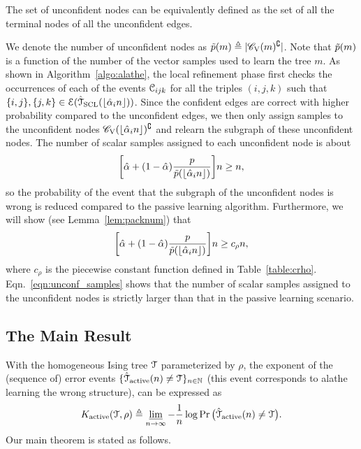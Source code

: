 \begin{remark}
    The set of unconfident nodes can be equivalently defined as the set of all the terminal nodes of all the unconfident edges.
\end{remark}
We denote the number of unconfident nodes as $\tilde{p}(m)\triangleq |\mathscr{C}_{\mathrm{V}}(m)^{\complement}|$. Note that $\tilde{p}(m)$  is a function of the number of the vector samples used to learn the tree  $m$. As shown in Algorithm~\ref{algo:alathe}, the local refinement phase first checks the occurrences of each of the events $\mathcal{C}_{ijk}$ for all the triples $(i,j,k)$ such that 
$\{i,j\}, \{j,k\}\in \mathcal{E}(\hat{\mathcal{T}}_{\rm{SCL}}(\lfloor\hat{\alpha}_{i}n\rfloor))$. Since the confident edges are correct with higher probability compared to the unconfident edges, we then only assign samples to the unconfident nodes $\mathscr{C}_{\mathrm{V}}(\lfloor\hat{\alpha}_{i}n\rfloor)^{\complement}$ and relearn the 
subgraph of these unconfident nodes. The number of scalar samples assigned to each unconfident node is about
\begin{align}
\bigg[\hat{\alpha}+(1-\hat{\alpha})\frac{p}{\tilde{p}(\lfloor\hat{\alpha}_{i}n\rfloor)}\bigg]n\geq n,    
\end{align}
 so the probability of the event that the 
subgraph of the unconfident nodes is wrong is reduced compared to the passive learning algorithm. Furthermore, we will show (see Lemma~\ref{lem:packnum}) that 
\begin{align}
\bigg[\hat{\alpha}+(1-\hat{\alpha})\frac{p}{\tilde{p}(\lfloor\hat{\alpha}_{i}n\rfloor)}\bigg]n\geq c_{\rho}n,   \label{eqn:unconf_samples}  
\end{align}
 where $c_{\rho}$ is the  piecewise constant  function  defined in Table~\ref{table:crho}. Eqn.~\eqref{eqn:unconf_samples} shows that the number of scalar samples assigned to the unconfident nodes is strictly  larger than that in the passive learning scenario.

\subsection{The Main Result} \label{sec:main_res}
With the homogeneous Ising tree $\mathcal{T}$ parameterized by $\rho$, the exponent of the (sequence of) error events $\{\hat{\mathcal{T}}_{{\rm active}}(n)\neq \mathcal{T}\}_{n\in\mathbb{N}}$ (this event corresponds to  \ac{alathe}  learning the wrong structure), can be expressed as
\begin{align}\label{eq:activeee}
	K _{{\rm active}}(\mathcal{T},\rho)\triangleq \varliminf_{n\rightarrow \infty}-\frac{1}{n}\log \Pr\big(\hat{\mathcal{T}}_{{\rm active}}(n)\neq \mathcal{T}\big).
\end{align}
Our main theorem is stated as follows.

